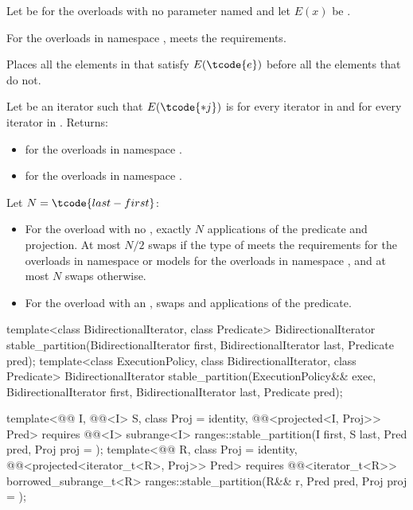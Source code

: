 \begin{itemdescr}
\pnum
Let  be 
for the overloads with no parameter named 
and let $E(x)$ be .

\pnum
\expects
For the overloads in namespace ,
 meets
the  requirements.

\pnum
\effects
Places all the elements  in 
that satisfy $E(\tcode{e})$ before all the elements that do not.

\pnum
\returns
Let  be an iterator such that $E(\tcode{*j})$ is
 for every iterator  in  and
 for every iterator  in .
Returns:
\begin{itemize}
\item {} for the overloads in namespace .
\item {} for the overloads in namespace .
\end{itemize}


\pnum
\complexity
Let $N = \tcode{last - first}$:
\begin{itemize}
\item
  For the overload with no ,
  exactly $N$ applications of the predicate and projection.
  At most $N / 2$ swaps if the type of  meets
  the  requirements
  for the overloads in namespace  or
  models 
  for the overloads in namespace ,
  and at most $N$ swaps otherwise.
\item
  For the overload with an ,
   swaps and  applications of the predicate.
\end{itemize}

\end{itemdescr}

%
\begin{itemdecl}
template<class BidirectionalIterator, class Predicate>
  BidirectionalIterator
    stable_partition(BidirectionalIterator first, BidirectionalIterator last, Predicate pred);
template<class ExecutionPolicy, class BidirectionalIterator, class Predicate>
  BidirectionalIterator
    stable_partition(ExecutionPolicy&& exec,
                     BidirectionalIterator first, BidirectionalIterator last, Predicate pred);

template<@@ I, @@<I> S, class Proj = identity,
         @@<projected<I, Proj>> Pred>
  requires @@<I>
  subrange<I> ranges::stable_partition(I first, S last, Pred pred, Proj proj = {});
template<@@ R, class Proj = identity,
         @@<projected<iterator_t<R>, Proj>> Pred>
  requires @@<iterator_t<R>>
  borrowed_subrange_t<R> ranges::stable_partition(R&& r, Pred pred, Proj proj = {});
\end{itemdecl}

